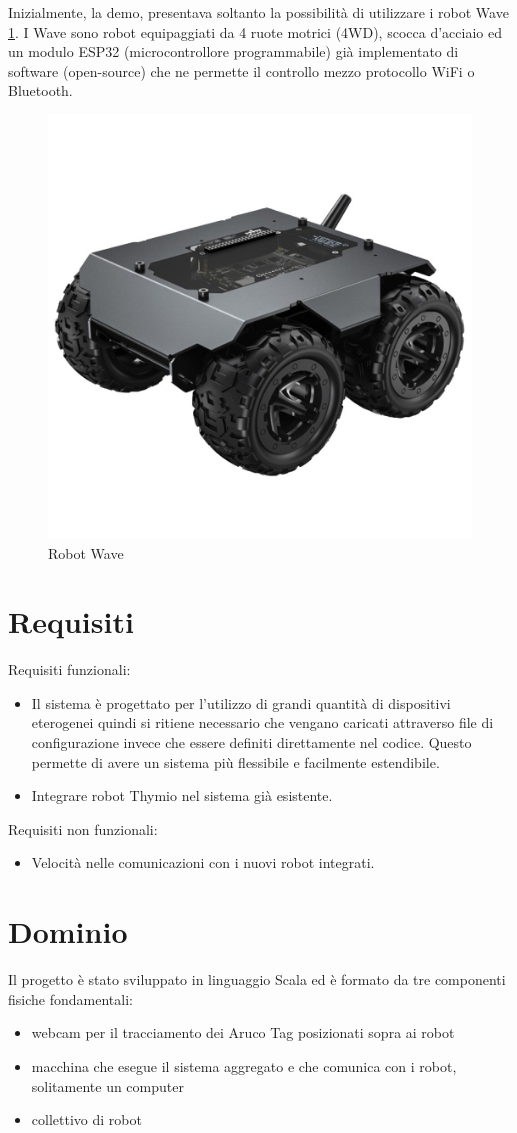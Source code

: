 \documentclass[12pt,a4paper,openright,twoside]{book}
\begin{document}
Inizialmente, la demo, presentava soltanto la possibilità di utilizzare i robot Wave \cref{fig:wave-robot}. I Wave sono robot equipaggiati da 4 ruote motrici (4WD), scocca d'acciaio ed un modulo ESP32 (microcontrollore programmabile) già implementato di software (open-source) che ne permette il controllo mezzo protocollo WiFi o Bluetooth.

\begin{figure}
    \centering
    \includegraphics[width=.3\linewidth]{figures/wave-robot.jpg}
    \caption{Robot Wave}
    \label{fig:wave-robot}
\end{figure}

\section{Requisiti}

Requisiti funzionali:
\begin{itemize}
    \item Il sistema è progettato per l'utilizzo di grandi quantità di dispositivi eterogenei quindi si ritiene necessario che vengano caricati attraverso file di configurazione invece che essere definiti direttamente nel codice. Questo permette di avere un sistema più flessibile e facilmente estendibile.
    \item Integrare robot Thymio nel sistema già esistente.
\end{itemize}

Requisiti non funzionali:
\begin{itemize}
    \item Velocità nelle comunicazioni con i nuovi robot integrati.
\end{itemize}

\section{Dominio}

Il progetto è stato sviluppato in linguaggio Scala ed è formato da tre componenti fisiche fondamentali:
\begin{itemize}
    \item webcam per il tracciamento dei Aruco Tag posizionati sopra ai robot
    \item macchina che esegue il sistema aggregato e che comunica con i robot, solitamente un computer
    \item collettivo di robot
\end{itemize}
\end{document}
